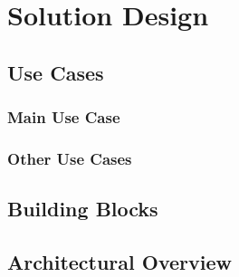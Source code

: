 \chapter{Solution Design}
\label{chapter:sol-design}

\section{Use Cases}
\label{sec:use-cases}

\subsection{Main Use Case}
\label{subsec:main-usecase}

\subsection{Other Use Cases}
\label{subsec:other-usecases}


\section{Building Blocks}
\label{sec:building-blocks}

\section{Architectural Overview}
\label{sec:arch-overview}

